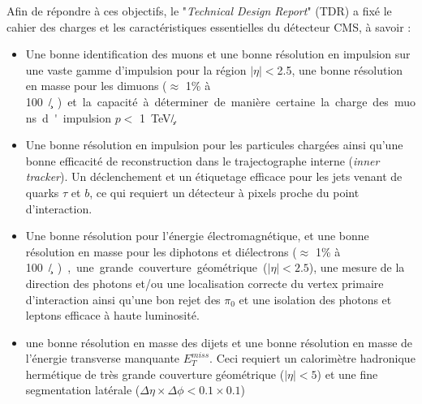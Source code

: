Afin de répondre à ces objectifs, le "\textit{Technical Design Report}" (TDR) \cite{Bayatian:922757} a fixé le cahier des charges et les caractéristiques essentielles du détecteur CMS, à savoir :
\begin{itemize}[label=$\bullet$]
	\item Une bonne identification des muons et une bonne résolution en impulsion sur une vaste gamme d'impulsion pour la région $|\eta|<$\num{2.5}, une bonne résolution en masse pour les dimuons ($\approx$ \num{1}\% à \SI{100}{\giga\eV/\square\c}) et la capacité à déterminer de manière certaine la charge des muons d'impulsion $p<$ \SI{1}{\tera\eV/\c}.
	\item Une bonne résolution en impulsion pour les particules chargées ainsi qu'une bonne efficacité de reconstruction dans le trajectographe interne (\textit{inner tracker}). Un déclenchement et un étiquetage efficace pour les jets venant de quarks $\tau$ et $b$, ce qui requiert un détecteur à pixels proche du point d'interaction.
	\item Une bonne résolution pour l'énergie électromagnétique, et une bonne résolution en masse pour les diphotons et diélectrons  ($\approx$ \num{1}\% à \SI{100}{\giga\eV/\square\c}), une grande couverture géométrique ($|\eta|<2.5$), une mesure de la direction des photons et/ou une localisation correcte du vertex primaire d'interaction ainsi qu'une bon rejet des $\pi_{0}$ et une isolation des photons et leptons efficace à haute luminosité.
	\item une bonne résolution en masse des dijets et une bonne résolution en masse de l'énergie transverse manquante $E_{T}^{miss}$. Ceci requiert un calorimètre hadronique hermétique de très grande couverture géométrique ($|\eta|<5$) et une fine segmentation latérale ($\Delta\eta\times\Delta\phi<0.1\times0.1$)
\end{itemize} 

